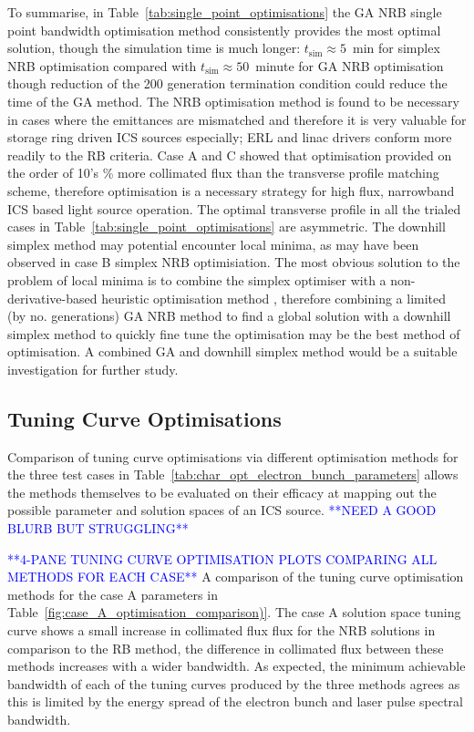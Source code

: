 \documentclass[../main.tex]{subfiles}
\begin{document}
To summarise, in Table~\ref{tab:single_point_optimisations} the GA NRB single point bandwidth optimisation method consistently provides the most optimal solution, though the simulation time is much longer: $t_{\mathrm{sim}}\approx 5$~\si{\minute} for simplex NRB optimisation compared with $t_{\mathrm{sim}}\approx 50$~\si{minute} for GA NRB optimisation though reduction of the 200 generation termination condition could reduce the time of the GA method. The NRB optimisation method is found to be necessary in cases where the emittances are mismatched and therefore it is very valuable for storage ring driven ICS sources especially; ERL and linac drivers conform more readily to the RB criteria. Case A and C showed that optimisation provided on the order of 10's \% more collimated flux than the transverse profile matching scheme, therefore optimisation is a necessary strategy for high flux, narrowband ICS based light source operation. The optimal transverse profile in all the trialed cases in Table~\ref{tab:single_point_optimisations} are asymmetric. The downhill simplex method may potential encounter local minima, as may have been observed in case B simplex NRB optimisiation. The most obvious solution to the problem of local minima is to combine the simplex
optimiser with a non-derivative-based heuristic optimisation method \cite{jones2016design}, therefore combining a limited (by no. generations) GA NRB method to find a global solution with a downhill simplex method to quickly fine tune the optimisation may be the best method of optimisation. A combined GA and downhill simplex method would be a suitable investigation for further study.

\subsection{Tuning Curve Optimisations}

Comparison of tuning curve optimisations via different optimisation methods for the three test cases in Table~\ref{tab:char_opt_electron_bunch_parameters} allows the methods themselves to be evaluated on their efficacy at mapping out the possible parameter and solution spaces of an ICS source. 
\textcolor{blue}{**NEED A GOOD BLURB BUT STRUGGLING**}

\textcolor{blue}{**4-PANE TUNING CURVE OPTIMISATION PLOTS COMPARING ALL METHODS FOR EACH CASE**}
A comparison of the tuning curve optimisation methods for the case A parameters in Table~\ref{fig:case_A_optimisation_comparison)}. The case A solution space tuning curve shows a small increase in collimated flux flux for the NRB solutions in comparison to the RB method, the difference in collimated flux between these methods increases with a wider bandwidth. As expected, the minimum achievable bandwidth of each of the tuning curves produced by the three methods agrees as this is limited by the energy spread of the electron bunch and laser pulse spectral bandwidth.   
\end{document}
